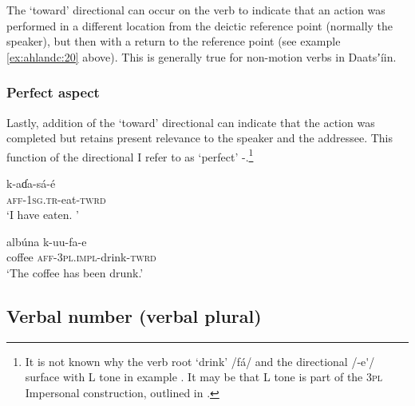 \documentclass[output=paper]{langsci/langscibook}
\begin{document}
The ‘toward’ directional can occur on the verb to indicate that an action was performed in a different location from the deictic reference point (normally the speaker), but then with a return to the reference point (see example \ref{ex:ahlandc:20} above). This is generally true for non-motion verbs in Daatsʼíin.

\subsubsection{Perfect aspect}\label{sec:ahlandc:4.6.3}

Lastly, addition of the ‘toward’ directional can indicate that the action was completed but retains present relevance to the speaker and the addressee. This function of the directional I refer to as ‘perfect’ -.\footnote{It is not known why the verb root ‘drink’ /fá/ and the directional /-e\'{ }/ surface with L tone in example .  It may be that L tone is part of the 3\textsc{pl} Impersonal construction, outlined in .}

\ea\label{ex:ahlandc:34}
\gll
k-aɗa-sá-é  \\
\textsc{aff-1sg.tr}-eat-\textsc{twrd} \\
\glt
‘I have eaten. ’
\z

\ea\label{ex:ahlandc:35}
\gll
alb\'{u}na k-uu-fa-e \\
coffee \textsc{aff-3pl.impl}{}-drink-\textsc{twrd} \\
\glt
‘The coffee has been drunk.’
\z


\subsection{Verbal number (verbal plural)}\label{sec:ahlandc:4.7}
\end{document}
